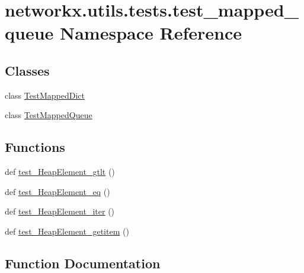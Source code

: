 \hypertarget{namespacenetworkx_1_1utils_1_1tests_1_1test__mapped__queue}{}\section{networkx.\+utils.\+tests.\+test\+\_\+mapped\+\_\+queue Namespace Reference}
\label{namespacenetworkx_1_1utils_1_1tests_1_1test__mapped__queue}
\subsection*{Classes}
\begin{DoxyCompactItemize}
\item 
class \hyperlink{classnetworkx_1_1utils_1_1tests_1_1test__mapped__queue_1_1TestMappedDict}{Test\+Mapped\+Dict}
\item 
class \hyperlink{classnetworkx_1_1utils_1_1tests_1_1test__mapped__queue_1_1TestMappedQueue}{Test\+Mapped\+Queue}
\end{DoxyCompactItemize}
\subsection*{Functions}
\begin{DoxyCompactItemize}
\item 
def \hyperlink{namespacenetworkx_1_1utils_1_1tests_1_1test__mapped__queue_a374d2489f00729725f9140a6e2531389}{test\+\_\+\+Heap\+Element\+\_\+gtlt} ()
\item 
def \hyperlink{namespacenetworkx_1_1utils_1_1tests_1_1test__mapped__queue_a10659742c69e10a315f0b2c96412c9cb}{test\+\_\+\+Heap\+Element\+\_\+eq} ()
\item 
def \hyperlink{namespacenetworkx_1_1utils_1_1tests_1_1test__mapped__queue_a7fc2169d00aa2dab532d662fd31915b7}{test\+\_\+\+Heap\+Element\+\_\+iter} ()
\item 
def \hyperlink{namespacenetworkx_1_1utils_1_1tests_1_1test__mapped__queue_a34726c7ed9051feaf3e408c6edfd43e9}{test\+\_\+\+Heap\+Element\+\_\+getitem} ()
\end{DoxyCompactItemize}


\subsection{Function Documentation}
\mbox{\label{namespacenetworkx_1_1utils_1_1tests_1_1test__mapped__queue_a10659742c69e10a315f0b2c96412c9cb}} 
